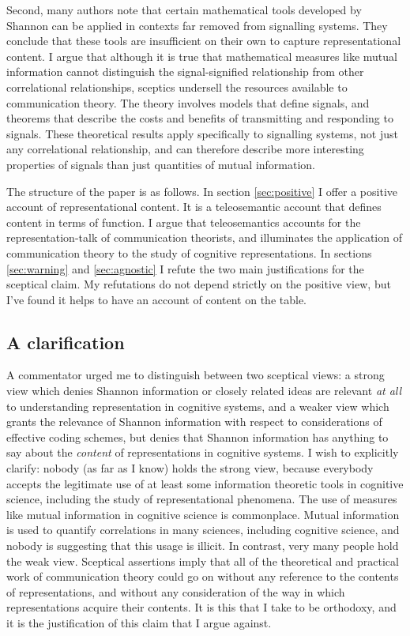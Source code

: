 \documentclass[12pt]{article}
\begin{document}
Second, many authors note that certain mathematical tools developed by Shannon can be applied in contexts far removed from signalling systems.
They conclude that these tools are insufficient on their own to capture representational content.
I argue that although it is true that mathematical measures like mutual information cannot distinguish the signal-signified relationship from other correlational relationships, sceptics undersell the resources available to communication theory.
The theory involves models that define signals, and theorems that describe the costs and benefits of transmitting and responding to signals.
These theoretical results apply specifically to signalling systems, not just any correlational relationship, and can therefore describe more interesting properties of signals than just quantities of mutual information.

The structure of the paper is as follows.
In section \ref{sec:positive} I offer a positive account of representational content.
It is a teleosemantic account that defines content in terms of function.
I argue that teleosemantics accounts for the representation-talk of communication theorists, and illuminates the application of communication theory to the study of cognitive representations.
In sections \ref{sec:warning} and \ref{sec:agnostic} I refute the two main justifications for the sceptical claim.
My refutations do not depend strictly on the positive view, but I've found it helps to have an account of content on the table.

\subsection{A clarification}

A commentator urged me to distinguish between two sceptical views: a strong view which denies Shannon information or closely related ideas are relevant \textit{at all} to understanding representation in cognitive systems, and a weaker view which grants the relevance of Shannon information with respect to considerations of effective coding schemes, but denies that Shannon information has anything to say about the \textit{content} of representations in cognitive systems.
I wish to explicitly clarify: nobody (as far as I know) holds the strong view, because everybody accepts the legitimate use of at least some information theoretic tools in cognitive science, including the study of representational phenomena.
The use of measures like mutual information in cognitive science is commonplace.
Mutual information is used to quantify correlations in many sciences, including cognitive science, and nobody is suggesting that this usage is illicit.
In contrast, very many people hold the weak view.
Sceptical assertions imply that all of the theoretical and practical work of communication theory could go on without any reference to the contents of representations, and without any consideration of the way in which representations acquire their contents.
It is this that I take to be orthodoxy, and it is the justification of this claim that I argue against.
\end{document}
